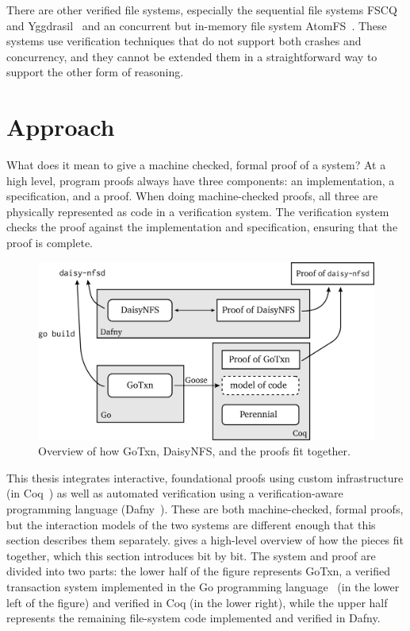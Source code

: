 There are other verified file systems, especially the sequential file systems
FSCQ~\cite{chen:fscq} and Yggdrasil~\cite{sigurbjarnarson:yggdrasil} and an
concurrent but in-memory file system AtomFS~\cite{zou:atomfs}. These systems use
verification techniques that do not support both crashes and concurrency, and they
cannot be extended them in a straightforward way to support the other form of reasoning.

\section{Approach}
\label{sec:intro:approach}

What does it mean to give a machine checked, formal proof of a system? At a high
level, program proofs always have three components: an implementation, a
specification, and a proof. When doing machine-checked proofs, all three are
physically represented as code in a verification system. The verification system
checks the proof against the implementation and specification, ensuring that the
proof is complete.

\begin{figure}[ht]
\includegraphics{fig/overview.png}
\caption{Overview of how GoTxn, DaisyNFS, and the proofs fit together.}
\label{fig:overview}
\end{figure}

This thesis integrates interactive, foundational proofs using custom
infrastructure (in Coq~\cite{coq}) as well as automated verification using a
verification-aware programming language (Dafny~\cite{leino:dafny}). These are
both machine-checked, formal proofs, but the interaction models of the two
systems are different enough that this section describes them separately.
 gives a high-level overview of how the pieces fit together,
which this section introduces bit by bit. The system and proof are divided into
two parts: the lower half of the figure represents GoTxn, a verified transaction
system implemented in the Go programming language~\cite{lang:go} (in the lower
left of the figure) and verified in Coq (in the lower right), while the upper
half represents the remaining file-system code implemented and verified in
Dafny.

